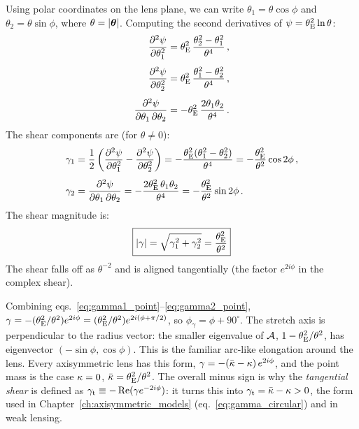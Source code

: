 Using polar coordinates on the lens plane, we can write
$\theta_1 = \theta\cos\phi$ and $\theta_2 = \theta\sin\phi$,
where $\theta = |\boldsymbol{\theta}|$.  Computing the second derivatives of
$\psi = \theta_{\mathrm{E}}^2 \ln\theta$:
\begin{align}
    \frac{\partial^2 \psi}{\partial\theta_1^2}
    &= \theta_{\mathrm{E}}^2\,\frac{\theta_2^2 - \theta_1^2}{\theta^4}\,, \nonumber \\[4pt]
    \frac{\partial^2 \psi}{\partial\theta_2^2}
    &= \theta_{\mathrm{E}}^2\,\frac{\theta_1^2 - \theta_2^2}{\theta^4}\,, \nonumber \\[4pt]
    \frac{\partial^2 \psi}{\partial\theta_1\,\partial\theta_2}
    &= -\theta_{\mathrm{E}}^2\,\frac{2\theta_1\theta_2}{\theta^4} \,.
    \label{eq:psi_second_derivs_point}
\end{align}
The shear components are (for $\theta \neq 0$):
\begin{align}
    \gamma_1 &= \frac{1}{2}\left(
    \frac{\partial^2\psi}{\partial\theta_1^2}
    - \frac{\partial^2\psi}{\partial\theta_2^2}\right)
    = -\frac{\theta_{\mathrm{E}}^2(\theta_1^2 - \theta_2^2)}{\theta^4}
    = -\frac{\theta_{\mathrm{E}}^2}{\theta^2}\cos 2\phi \,,
    \label{eq:gamma1_point} \\[4pt]
    \gamma_2 &= \frac{\partial^2\psi}{\partial\theta_1\,\partial\theta_2}
    = -\frac{2\theta_{\mathrm{E}}^2\,\theta_1\theta_2}{\theta^4}
    = -\frac{\theta_{\mathrm{E}}^2}{\theta^2}\sin 2\phi \,.
    \label{eq:gamma2_point}
\end{align}
The shear magnitude is:
\begin{equation}
    \boxed{
    |\gamma| = \sqrt{\gamma_1^2 + \gamma_2^2}
    = \frac{\theta_{\mathrm{E}}^2}{\theta^2}
    }
    \label{eq:gamma_magnitude_point}
\end{equation}
The shear falls off as $\theta^{-2}$ and is aligned tangentially
(the factor $e^{2i\phi}$ in the complex shear).
\begin{annotation}
Combining eqs.~\eqref{eq:gamma1_point}--\eqref{eq:gamma2_point},
$\gamma = -(\theta_{\mathrm{E}}^2/\theta^2)e^{2i\phi} = (\theta_{\mathrm{E}}^2/\theta^2)e^{2i(\phi + \pi/2)}$,
so $\phi_\gamma = \phi + 90^\circ$. The stretch axis is perpendicular to the
radius vector: the smaller eigenvalue of $\mathcal{A}$, $1 - \theta_{\mathrm{E}}^2/\theta^2$, has
eigenvector $(-\sin\phi, \cos\phi)$. This is the familiar arc-like elongation
around the lens. Every axisymmetric lens has this form,
$\gamma = -(\bar{\kappa} - \kappa)\,e^{2i\phi}$, and the point mass is the
case $\kappa = 0$, $\bar{\kappa} = \theta_{\mathrm{E}}^2/\theta^2$. The overall minus
sign is why the \emph{tangential shear} is defined as
$\gamma_{\mathrm t} \equiv -\operatorname{Re}(\gamma e^{-2i\phi})$: it
turns this into $\gamma_{\mathrm t} = \bar{\kappa} - \kappa > 0$, the form used in
Chapter~\ref{ch:axisymmetric_models} (eq.~\ref{eq:gamma_circular}) and in weak
lensing.
\end{annotation}

